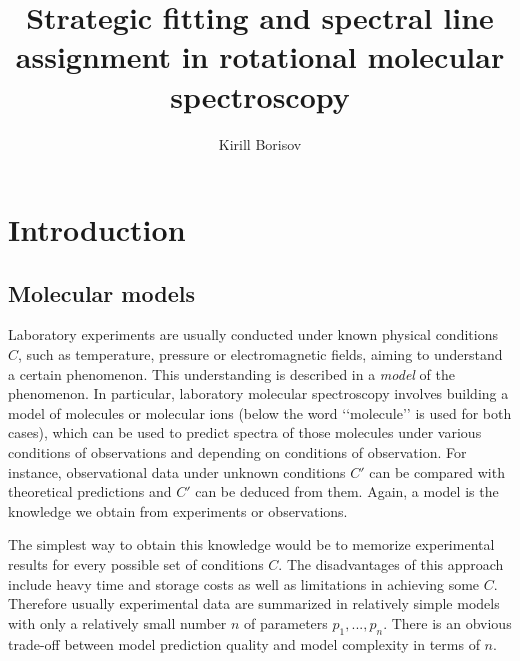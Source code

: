 \documentclass[11pt]{article}
\title{Strategic fitting and spectral line assignment in rotational molecular spectroscopy}
\author{Kirill Borisov}
\begin{document}
\begin{titlepage}
\maketitle
\end{titlepage}

\tableofcontents
\newpage

\section{Introduction}



\subsection{Molecular models}

Laboratory experiments are usually conducted under known physical conditions $C$, such as temperature, pressure or electromagnetic fields, aiming to understand a certain phenomenon. This understanding is described in a \emph{model} of the phenomenon. In particular, laboratory molecular spectroscopy involves building a model of molecules or molecular ions (below the word \lq\lq{}molecule\rq\rq{} is used for both cases), which can be used to predict spectra of those molecules under various conditions of observations and depending on conditions of observation. For instance, observational data under unknown conditions $C'$ can be compared with theoretical predictions and $C'$ can be deduced from them. Again, a model is the knowledge we obtain from experiments or observations. 

The simplest way to obtain this knowledge would be to memorize experimental results for every possible set of conditions $C$. The disadvantages of this approach include heavy time and storage costs as well as limitations in achieving some $C$. Therefore usually experimental data are summarized in relatively simple models with only a relatively small number $n$ of parameters $p_1, ..., p_n$. There is an obvious trade-off between model prediction quality and model complexity in terms of $n$.
\end{document}
